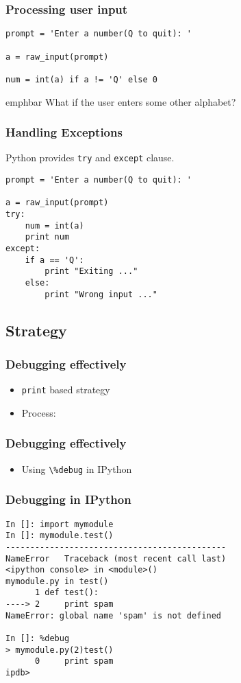 \documentclass[compress,14pt]{beamer}
\newcommand{\emphbar}[1]
{\begin{beamercolorbox}[rounded=true]{emphbar} 
      {#1}
 \end{beamercolorbox}
}
\newcommand{\typ}[1]{\lstinline{#1}}
\newcounter{time}
\newcommand{\inctime}[1]{\addtocounter{time}{#1}{\vspace*{0.1in}\tiny \thetime\ m}}
\begin{document}
\begin{frame}[fragile]
  \frametitle{Processing user input}
  \begin{lstlisting}
prompt = 'Enter a number(Q to quit): '

a = raw_input(prompt)

num = int(a) if a != 'Q' else 0
  \end{lstlisting}
  \emphbar{What if the user enters some other alphabet?}
\end{frame}


\begin{frame}[fragile]
  \frametitle{Handling Exceptions}
  Python provides \typ{try} and \typ{except} clause.
  \begin{lstlisting}
prompt = 'Enter a number(Q to quit): '

a = raw_input(prompt)
try:
    num = int(a)
    print num
except:
    if a == 'Q':
        print "Exiting ..."
    else:
        print "Wrong input ..."
  \end{lstlisting}  
\end{frame}

\subsection{Strategy}
\begin{frame}[fragile]
    \frametitle{Debugging effectively}
    \begin{itemize}
        \item \typ{print} based strategy
        \item Process:
    \end{itemize}
\begin{center}
\end{center}
\end{frame}

\begin{frame}[fragile]
    \frametitle{Debugging effectively}
    \begin{itemize}
      \item Using \typ{\%debug} in IPython
    \end{itemize}
\end{frame}

\begin{frame}[fragile]
\frametitle{Debugging in IPython}
\small
\begin{lstlisting}
In []: import mymodule
In []: mymodule.test()
---------------------------------------------
NameError   Traceback (most recent call last)
<ipython console> in <module>()
mymodule.py in test()
      1 def test():
----> 2     print spam
NameError: global name 'spam' is not defined

In []: %debug
> mymodule.py(2)test()
      0     print spam
ipdb> 
\end{lstlisting}
\inctime{15} 
\end{frame}
\end{document}
